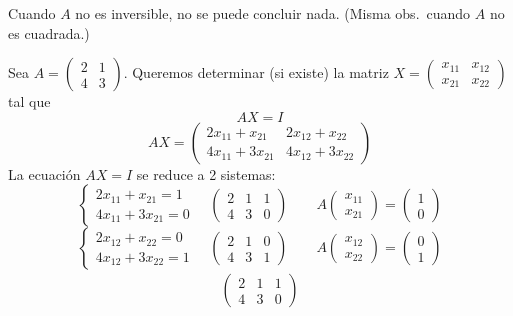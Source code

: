 \documentclass[11pt,a4paper]{article}
\begin{document}
\begin{observacion}
Cuando $A$ no es inversible, no se puede concluir nada. (Misma obs.\ cuando $A$ no es cuadrada.)
\end{observacion}

\begin{ejemplo}
Sea $A=\begin{pmatrix}2&1\\4&3\end{pmatrix}$. Queremos determinar (si existe) la matriz $X=\begin{pmatrix}x_{11}&x_{12}\\x_{21}&x_{22}\end{pmatrix}$ tal que
\[
AX=I
\]
\[
AX=\begin{pmatrix}2x_{11}+x_{21} & 2x_{12}+x_{22}\\ 4x_{11}+3x_{21} & 4x_{12}+3x_{22}\end{pmatrix}
\]
La ecuación $AX=I$ se reduce a 2 sistemas:
\[
\begin{cases}2x_{11}+x_{21}=1\\4x_{11}+3x_{21}=0\end{cases}
\quad\left(\begin{array}{cc|c}2&1&1\\4&3&0\end{array}\right)
\qquad
A\begin{pmatrix}x_{11}\\x_{21}\end{pmatrix}=\begin{pmatrix}1\\0\end{pmatrix}
\]
\[
\begin{cases}2x_{12}+x_{22}=0\\4x_{12}+3x_{22}=1\end{cases}
\quad\left(\begin{array}{cc|c}2&1&0\\4&3&1\end{array}\right)
\qquad
A\begin{pmatrix}x_{12}\\x_{22}\end{pmatrix}=\begin{pmatrix}0\\1\end{pmatrix}
\]
\[
\begin{array}{ll}
\left(\begin{array}{cc|c}2&1&1\\4&3&0\end{array}\right)

\end{array}\]
\end{ejemplo}
\end{document}
